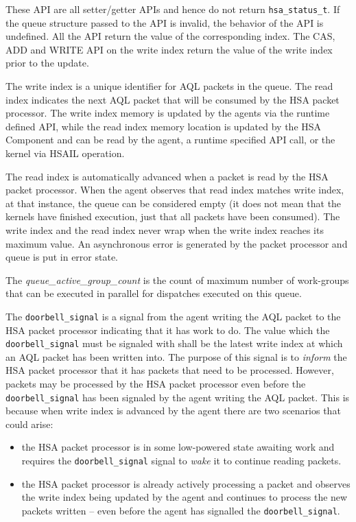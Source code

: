 

These API are all setter/getter APIs and hence do not return
\texttt{hsa\_status\_t}. If the queue structure passed to the API is
invalid, the behavior of the API is undefined. All the API return
the value of the corresponding index. The CAS, ADD and WRITE API on
the write index return the value of the write index prior to the
update.

The write index is a unique identifier for AQL packets in the
queue. The read index indicates the next AQL packet that will be
consumed by the HSA packet processor.  The write index
memory is updated by the agents via the runtime defined
API, while the read index memory location is updated by
the H\-S\-A Component and can be read by the agent,
a runtime specified API call, or the kernel via HSAIL operation.

The read index is automatically advanced when a packet is
read by the HSA packet processor. When the agent observes that read
index matches write index, at that instance, the queue can be
considered empty (it does not mean that the kernels have finished
execution, just that all packets have been consumed). The write
index and the read index never wrap when the write index reaches
its maximum value. An asynchronous error is generated by the packet
processor and queue is put in error state.

The {\itshape
queue\_active\_group\_count} is the count of maximum number of
work-groups that can be executed in parallel for dispatches executed
on this queue.

The \texttt{doorbell\_signal} is a signal from the agent writing the
AQL packet to the HSA packet processor indicating that it has work
to do. The value which the \texttt{doorbell\_signal} must be
signaled with shall be the latest write index at
which an AQL packet has been written into.  The purpose of this
signal is to \emph{inform} the HSA packet processor that it has
packets that need to be processed. However, packets may be processed
by the HSA packet processor even before the
\texttt{doorbell\_signal} has been signaled by the agent writing the
AQL packet.  This is because when write index is advanced by the
agent there are two scenarios that could arise:

\begin{itemize}
        \item the HSA packet processor is in some low-powered state
                awaiting work and requires the
                \texttt{doorbell\_signal} signal to \emph{wake} it
                to continue reading packets.
        \item the H\-S\-A
                packet processor is already actively processing a
                packet and observes the write index being
                updated by the agent and continues to process the
                new packets written -- even before the agent has
                signalled the \texttt{doorbell\_signal}.
\end{itemize}

